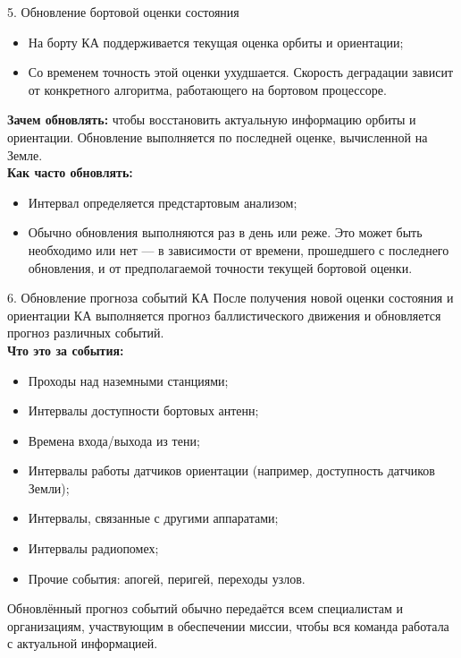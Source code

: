 \documentclass[8pt]{beamer}
\begin{document}
\begin{frame}{5. Обновление бортовой оценки состояния}
\begin{itemize}
    \item На борту КА поддерживается текущая оценка орбиты и ориентации;
    \item Со временем точность этой оценки ухудшается. Скорость деградации зависит от конкретного алгоритма, работающего на бортовом процессоре.
\end{itemize}
\textbf{Зачем обновлять:} чтобы восстановить актуальную информацию орбиты и ориентации. Обновление выполняется по последней оценке, вычисленной на Земле. \\
\smallskip
\textbf{Как часто обновлять:}
\begin{itemize}
    \item Интервал определяется предстартовым анализом;
    \item Обычно обновления выполняются раз в день или реже. Это может быть необходимо или нет — в зависимости от времени, прошедшего с последнего обновления, и от предполагаемой точности текущей бортовой оценки.
\end{itemize}
\end{frame}

\begin{frame}{6. Обновление прогноза событий КА}
После получения новой оценки состояния и ориентации КА выполняется прогноз баллистического движения и обновляется прогноз различных событий. \\
\textbf{Что это за события:}
\begin{itemize}
    \item Проходы над наземными станциями;
    \item Интервалы доступности бортовых антенн;
    \item Времена входа/выхода из тени;
    \item Интервалы работы датчиков ориентации (например, доступность датчиков Земли);
    \item Интервалы, связанные с другими аппаратами;
    \item Интервалы радиопомех;
    \item Прочие события: апогей, перигей, переходы узлов.
\end{itemize}

Обновлённый прогноз событий обычно передаётся всем специалистам и организациям, участвующим в обеспечении миссии, чтобы вся команда работала с актуальной информацией.
\end{frame}
\end{document}
